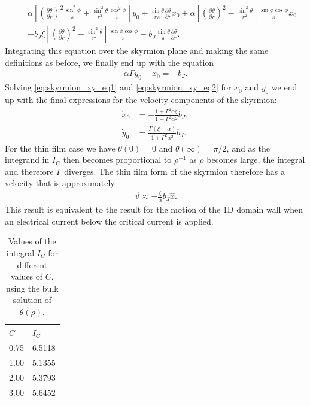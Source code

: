 \documentclass[12pt, a4paper, twoside, openright]{article}		%
\numberwithin{equation}{section}
\begin{document}
\begin{align}
\nonumber &\alpha\left[ (\frac{\partial\theta}{\partial r})^2\frac{\sin^2\phi}{\pi} + \frac{\sin^2\theta}{r^2}\frac{\cos^2\phi}{\pi}\right] \dot{y}_0 + \frac{\sin\theta}{r \pi}\frac{\partial\theta}{\partial r}\dot{x}_0 
+ \alpha \left[(\frac{\partial\theta}{\partial r})^2-\frac{\sin^2\theta}{r^2}\right]\frac{\sin\phi\cos\phi}{\pi}\dot{x}_0 \\
= &-b_J\xi\left[ (\frac{\partial\theta}{\partial r})^2 - \frac{\sin^2\theta}{r^2}\right]\frac{\sin\phi\cos\phi}{\pi} - b_J\frac{\sin\theta}{\pi}\frac{\partial\theta}{\partial r}.
\end{align}
Integrating this equation over the skyrmion plane and making the same definitions as before, we finally end up with the equation
\begin{align}
\label{eq:skyrmion_xy_eq2}
\alpha\Gamma\dot{y}_0 + \dot{x}_0 = -b_J.
\end{align}
Solving \eqref{eq:skyrmion_xy_eq1} and \eqref{eq:skyrmion_xy_eq2} for $\dot{x}_0$ and $\dot{y}_0$ we end up with the final expressions for the velocity components of the skyrmion:
\begin{align}
\dot{x}_0 &= -\frac{1+\Gamma^2\alpha\xi}{1+\Gamma^2\alpha^2}b_J, \label{eq:skyrmion_xdot} \\
\dot{y}_0 &= \frac{\Gamma(\xi-\alpha)}{1+\Gamma^2\alpha^2}b_J. \label{eq:skyrmion_ydot}
\end{align}
For the thin film case we have $\theta(0) = 0$ and $\theta(\infty)=\pi/2$, and as the integrand in $I_C$ then becomes proportional to $\rho^{-1}$ as $\rho$ becomes large, the integral and therefore $\Gamma$ diverges. The thin film form of the skyrmion therefore has a velocity that is approximately
\begin{align}
\vec{v} \approx -\frac{\xi}{\alpha}b_J\hat{x}.
\end{align}
This result is equivalent to the result for the motion of the 1D domain wall when an electrical current below the critical current is applied.\\
\begin{table}[h!]
	\centering
		\caption{Values of the integral $I_C$ for different values of $C$, using the bulk solution of $\theta(\rho)$.} 
	\begin{tabular}{l l} \hline
	$C$ & $I_C$\\ \hline
	0.75  & 6.5118\\
 	1.00  & 5.1355\\
 	2.00  & 5.3793 \\ 
 	3.00  & 5.6452 \\ \hline
	\end{tabular}
	\label{tab:C_I}
\end{table}
\end{document}

